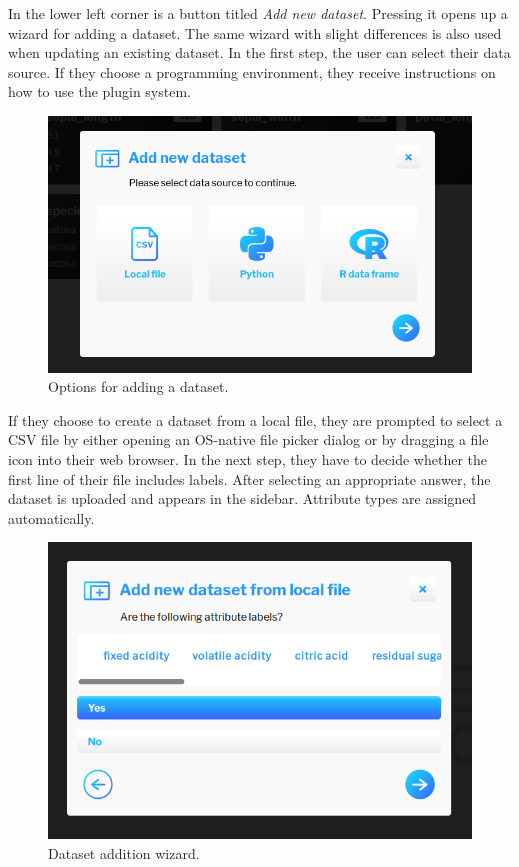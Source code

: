 \documentclass[thesis=M,english,hidelinks]{FITthesisXE}[2012/06/26]
\begin{document}
In the lower left corner is a button titled \emph{Add new dataset}. Pressing it opens up a wizard for adding a dataset. The same wizard with slight differences is also used when updating an existing dataset. In the first step, the user can select their data source. If they choose a programming environment, they receive instructions on how to use the plugin system.

\begin{figure}[ht]
\centering
\includegraphics[scale=0.4]{manager_add}
\caption{Options for adding a dataset.}
\label{fig:manager_add}
\end{figure}

\newpage

If they choose to create a dataset from a local file, they are prompted to select a CSV file by either opening an OS-native file picker dialog or by dragging a file icon into their web browser. In the next step, they have to decide whether the first line of their file includes labels. After selecting an appropriate answer, the dataset is uploaded and appears in the sidebar. Attribute types are assigned automatically.

\begin{figure}[ht]
\centering
\includegraphics[scale=0.4]{manager_labels}
\caption{Dataset addition wizard.}
\label{fig:manager_labels}
\end{figure}
\end{document}
